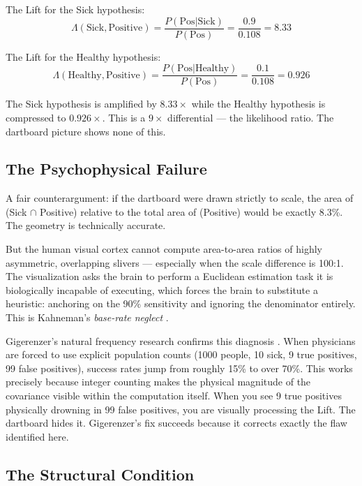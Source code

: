\documentclass[12pt]{article}
\begin{document}
The Lift for the Sick hypothesis:
\begin{equation}
\Lambda(\text{Sick}, \text{Positive}) = \frac{P(\text{Pos}|\text{Sick})}{P(\text{Pos})} = \frac{0.9}{0.108} = 8.33
\end{equation}

The Lift for the Healthy hypothesis:
\begin{equation}
\Lambda(\text{Healthy}, \text{Positive}) = \frac{P(\text{Pos}|\text{Healthy})}{P(\text{Pos})} = \frac{0.1}{0.108} = 0.926
\end{equation}

The Sick hypothesis is amplified by $8.33\times$ while the Healthy hypothesis is compressed to $0.926\times$. This is a $9\times$ differential --- the likelihood ratio. The dartboard picture shows none of this.

\subsection{The Psychophysical Failure}

A fair counterargument: if the dartboard were drawn strictly to scale, the area of (Sick $\cap$ Positive) relative to the total area of (Positive) would be exactly 8.3\%. The geometry is technically accurate.

But the human visual cortex cannot compute area-to-area ratios of highly asymmetric, overlapping slivers --- especially when the scale difference is 100:1. The visualization asks the brain to perform a Euclidean estimation task it is biologically incapable of executing, which forces the brain to substitute a heuristic: anchoring on the 90\% sensitivity and ignoring the denominator entirely. This is Kahneman's \textit{base-rate neglect} \cite{kahneman2011}.

Gigerenzer's natural frequency research confirms this diagnosis \cite{gigerenzer2003}. When physicians are forced to use explicit population counts (1000 people, 10 sick, 9 true positives, 99 false positives), success rates jump from roughly 15\% to over 70\%. This works precisely because integer counting makes the physical magnitude of the covariance visible within the computation itself. When you see 9 true positives physically drowning in 99 false positives, you are visually processing the Lift. The dartboard hides it. Gigerenzer's fix succeeds because it corrects exactly the flaw identified here.

\subsection{The Structural Condition}
\end{document}
